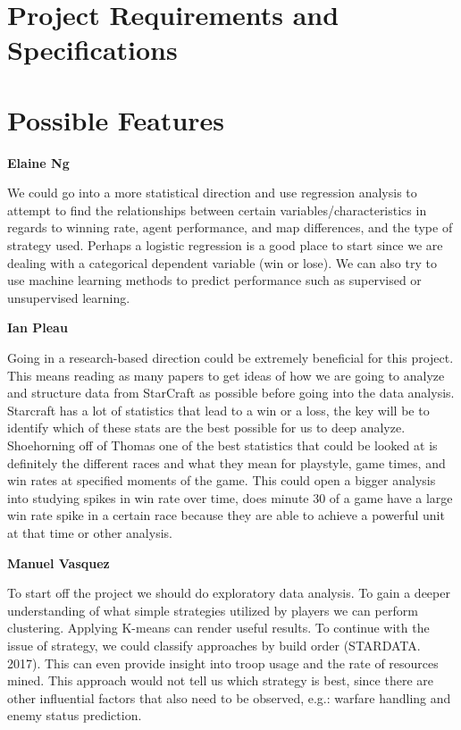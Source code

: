 \documentclass[a4paper,12pt]{report}
\newcommand{\msection}[1]{\noindent\textbf{#1}}
\begin{document}
\section{Project Requirements and Specifications}

\section{Possible Features}

\msection{Elaine Ng}

We could go into a more statistical direction and use regression analysis to attempt to find the relationships between certain variables/characteristics in regards to winning rate, agent performance, and map differences, and the type of strategy used. Perhaps a logistic regression is a good place to start since we are dealing with a categorical dependent variable (win or lose). We can also try to use machine learning methods to predict performance such as supervised or unsupervised learning.

\msection{Ian Pleau}

Going in a research-based direction could be extremely beneficial for this project. This means reading as many papers to get ideas of how we are going to analyze and structure data from StarCraft as possible before going into the data analysis. Starcraft has a lot of statistics that lead to a win or a loss, the key will be to identify which of these stats are the best possible for us to deep analyze. Shoehorning off of Thomas one of the best statistics that could be looked at is definitely the different races and what they mean for playstyle, game times, and win rates at specified moments of the game. This could open a bigger analysis into studying spikes in win rate over time, does minute 30 of a game have a large win rate spike in a certain race because they are able to achieve a powerful unit at that time or other analysis.

\msection{Manuel Vasquez}

To start off the project we should do exploratory data analysis. To gain a deeper understanding of what simple strategies utilized by players we can perform clustering. Applying K-means can render useful results. To continue with the issue of strategy, we could classify approaches by build order (STARDATA. 2017). This can even provide insight into troop usage and the rate of resources mined. This approach would not tell us which strategy is best, since there are other influential factors that also need to be observed, e.g.: warfare handling and enemy status prediction.
\end{document}
